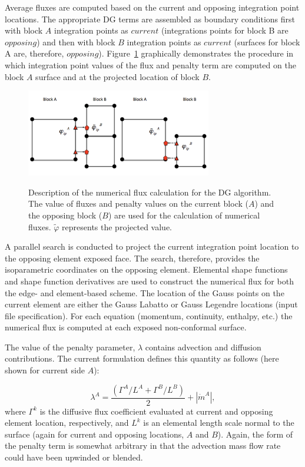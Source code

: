 Average fluxes are computed based on the current and opposing integration point locations. The 
appropriate DG terms are assembled as boundary conditions first with block $A$ integration 
points as $current$ (integrations points for block B are $opposing$) and then with block $B$ 
integration points as $current$ (surfaces for block A are, therefore, $opposing$). Figure~\ref{nonConformal} 
graphically demonstrates the procedure in which integration point values of the flux and penalty 
term are computed on the block $A$ surface and at the projected location of block $B$. 

\begin{figure}
\centering
  {\includegraphics[height=1.5in]{images/contactSearchAndEval.pdf}}
  \vspace{0.25in}
  \caption{Description of the numerical flux calculation for the DG algorithm. The 
    value of fluxes and penalty values on the current block ($A$) and the opposing block ($B$) are used 
    for the calculation of numerical fluxes. $\tilde \varphi$ represents the projected value.}
  \label{nonConformal}
\end{figure}

A parallel search is conducted to project the current integration point location to the opposing element exposed face. 
The search, therefore, provides the isoparametric coordinates on the opposing element. Elemental shape functions 
and shape function derivatives are used to construct the numerical flux for both the edge- and element-based 
scheme. The location of the Gauss points on the current element are either the Gauss Labatto or Gauss Legendre 
locations (input file specification). For each equation (momentum, continuity, enthalpy, etc.) the numerical 
flux is computed at each exposed non-conformal surface.

The value of the penalty parameter, $\lambda$ contains advection and diffusion contributions. The current 
formulation defines this quantity as follows (here shown for current side $A$):

\begin{equation} 
        \lambda^A = \frac{(\Gamma^A / L^A + \Gamma^B / L^B )}{2} + |\dot{m}^A|,
\label{lamdbaA}
\end{equation}
where $\Gamma^k$ is the diffusive flux coefficient evaluated at current and opposing element location, respectively, 
and $L^k$ is an elemental length scale normal to the surface (again for current and opposing locations, $A$ and $B$). 
Again, the form of the penalty term is somewhat arbitrary in that the advection mass flow rate could have been upwinded 
or blended.

